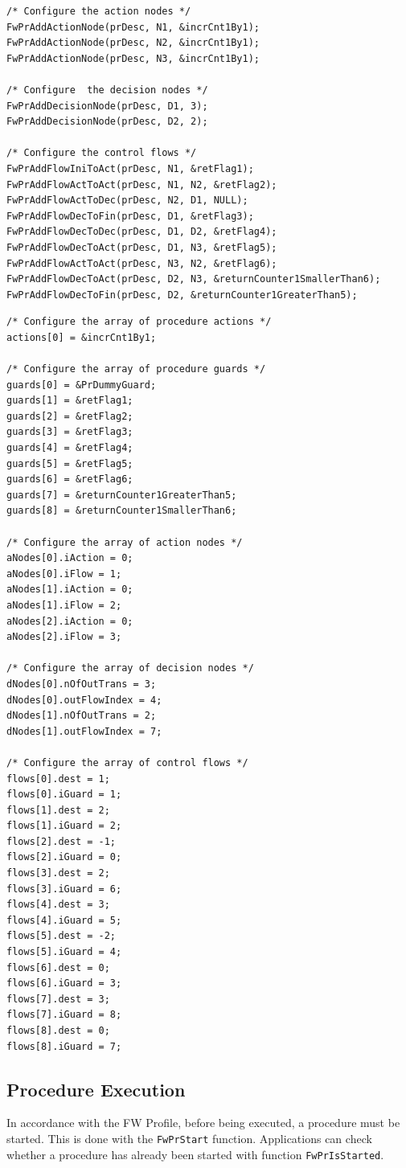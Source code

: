 \documentclass[a4paper,10pt]{article}
\begin{document}
\begin{lstlisting}
/* Configure the action nodes */
FwPrAddActionNode(prDesc, N1, &incrCnt1By1);
FwPrAddActionNode(prDesc, N2, &incrCnt1By1);
FwPrAddActionNode(prDesc, N3, &incrCnt1By1);

/* Configure  the decision nodes */
FwPrAddDecisionNode(prDesc, D1, 3);
FwPrAddDecisionNode(prDesc, D2, 2);

/* Configure the control flows */
FwPrAddFlowIniToAct(prDesc, N1, &retFlag1);
FwPrAddFlowActToAct(prDesc, N1, N2, &retFlag2);
FwPrAddFlowActToDec(prDesc, N2, D1, NULL);
FwPrAddFlowDecToFin(prDesc, D1, &retFlag3);
FwPrAddFlowDecToDec(prDesc, D1, D2, &retFlag4);
FwPrAddFlowDecToAct(prDesc, D1, N3, &retFlag5);
FwPrAddFlowActToAct(prDesc, N3, N2, &retFlag6);
FwPrAddFlowDecToAct(prDesc, D2, N3, &returnCounter1SmallerThan6);
FwPrAddFlowDecToFin(prDesc, D2, &returnCounter1GreaterThan5);
\end{lstlisting}


\begin{lstlisting}
/* Configure the array of procedure actions */
actions[0] = &incrCnt1By1;

/* Configure the array of procedure guards */
guards[0] = &PrDummyGuard;
guards[1] = &retFlag1;
guards[2] = &retFlag2;
guards[3] = &retFlag3;
guards[4] = &retFlag4;
guards[5] = &retFlag5;
guards[6] = &retFlag6;
guards[7] = &returnCounter1GreaterThan5;
guards[8] = &returnCounter1SmallerThan6;

/* Configure the array of action nodes */
aNodes[0].iAction = 0;
aNodes[0].iFlow = 1;
aNodes[1].iAction = 0;
aNodes[1].iFlow = 2;
aNodes[2].iAction = 0;
aNodes[2].iFlow = 3;

/* Configure the array of decision nodes */
dNodes[0].nOfOutTrans = 3;
dNodes[0].outFlowIndex = 4;
dNodes[1].nOfOutTrans = 2;
dNodes[1].outFlowIndex = 7;

/* Configure the array of control flows */
flows[0].dest = 1;
flows[0].iGuard = 1;
flows[1].dest = 2;
flows[1].iGuard = 2;
flows[2].dest = -1;
flows[2].iGuard = 0;
flows[3].dest = 2;
flows[3].iGuard = 6;
flows[4].dest = 3;
flows[4].iGuard = 5;
flows[5].dest = -2;
flows[5].iGuard = 4;
flows[6].dest = 0;
flows[6].iGuard = 3;
flows[7].dest = 3;
flows[7].iGuard = 8;
flows[8].dest = 0;
flows[8].iGuard = 7;
\end{lstlisting}

\subsection{Procedure Execution}\label{sec:PrExecution}
In accordance with the FW Profile, 
before being executed, a procedure must be started. This is done with the \texttt{FwPrStart} function. Applications 
can check whether a procedure has already been started with function \texttt{FwPrIsStarted}.
\end{document}
